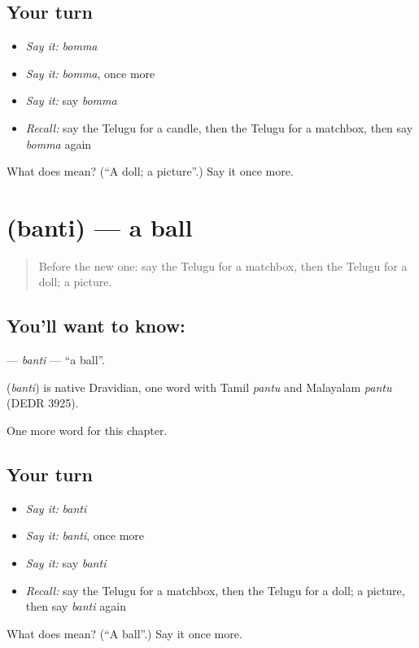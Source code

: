 \subsection*{Your turn}
\begin{itemize}
\raggedright
  \item \emph{Say it:} \emph{bomma}
  \item \emph{Say it:} \emph{bomma}, once more
  \item \emph{Say it:} say \emph{bomma}
  \item \emph{Recall:} say the Telugu for a candle, then the Telugu for a matchbox, then say \emph{bomma} again
\end{itemize}

\begin{tcolorbox}[breakable,colback=teal!4,colframe=teal!35!black,title={Before you move on}]
What does  mean? (\textquotedblleft{}A doll; a picture\textquotedblright{}.) Say it once more.
\end{tcolorbox}
\section[\texorpdfstring{\te{బంతి} (banti)}{బంతి (banti)}]{ (banti) — a ball}

\label{lesson:TE-C113-banti}



\begin{quote}
Before the new one: say the Telugu for a matchbox, then the Telugu for a doll; a picture.
\end{quote}

\subsection*{You'll want to know: }
\textbf{} — \emph{banti} — \textquotedblleft{}a ball\textquotedblright{}.

\begin{cousinweb}
\textbf{} (\emph{banti}) is native Dravidian, one word with Tamil \emph{pantu} and Malayalam \emph{pantu} (DEDR 3925).
\end{cousinweb}

\begin{grammarlens}[title={What you've built}]
One more word for this chapter.
\end{grammarlens}

\subsection*{Your turn}
\begin{itemize}
\raggedright
  \item \emph{Say it:} \emph{banti}
  \item \emph{Say it:} \emph{banti}, once more
  \item \emph{Say it:} say \emph{banti}
  \item \emph{Recall:} say the Telugu for a matchbox, then the Telugu for a doll; a picture, then say \emph{banti} again
\end{itemize}

\begin{tcolorbox}[breakable,colback=teal!4,colframe=teal!35!black,title={Before you move on}]
What does  mean? (\textquotedblleft{}A ball\textquotedblright{}.) Say it once more.
\end{tcolorbox}

